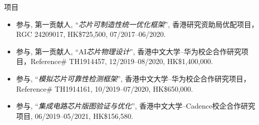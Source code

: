 
\begin{rSection}{项目}
    \begin{itemize}[leftmargin=*]
        \item 参与, 第一贡献人, ``\textit{芯片可制造性统一优化框架}'', 香港研究资助局优配项目，RGC 24209017, HK\$725,500, 07/2017--06/2020.
        \item 参与, 第一贡献人, ``AI\textit{芯片物理设计}'', 香港中文大学--华为校企合作研究项目，Reference\# TH1914457, 12/2019--08/2020, HK\$1,400,000.
        \item 参与, ``\textit{模拟芯片可靠性检测框架}'', 香港中文大学--华为校企合作研究项目， Reference\# TH1914161, 10/2019--07/2020, HK\$650,000.
        \item 参与, ``\textit{集成电路芯片版图验证与优化}'', 香港中文大学--Cadence校企合作研究项目, 06/2019--05/2021, HK\$156,580.
    \end{itemize}
\end{rSection}

